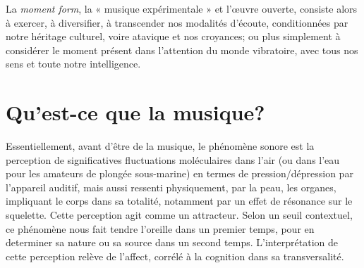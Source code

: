 \documentclass{article}
\begin{document}
\bigskip
La \textit{moment form}, la « musique expérimentale » et l'œuvre ouverte, consiste alors à exercer, à diversifier, à transcender nos modalités d'écoute, conditionnées par notre héritage culturel, voire atavique et nos croyances; ou plus simplement à considérer le moment présent dans l'attention du monde vibratoire, avec tous nos sens et toute notre intelligence.

\section*{Qu’est-ce que la musique?}

Essentiellement, avant d'être de la musique, le phénomène sonore est la perception de significatives fluctuations moléculaires dans l'air (ou dans l'eau pour les amateurs de plongée sous-marine) en termes de pression/dépression par l'appareil auditif, mais aussi ressenti physiquement, par la peau, les organes, impliquant le corps dans sa totalité, notamment par un effet de résonance sur le squelette. 
Cette perception agit comme un attracteur. Selon un seuil contextuel, ce phénomène nous fait tendre l'oreille dans un premier temps, pour en determiner sa nature ou sa source dans un second temps.
L'interprétation de cette perception relève de l'affect, corrélé à la cognition dans sa transversalité.
\bigskip
\end{document}
